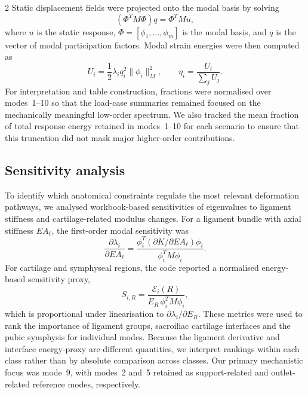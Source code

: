 \documentclass[openacc]{rsproca_new}
\begin{document}
\begin{multicols}{2}
Static displacement fields were projected onto the modal basis by solving
\begin{equation}
(\Phi^{T}M\Phi)q = \Phi^{T}Mu,
\end{equation}
where $u$ is the static response, $\Phi=[\phi_{1},\ldots,\phi_{m}]$ is the modal basis, and $q$ is the vector of modal participation factors. Modal strain energies were then computed as
\begin{equation}
U_{i}=\frac{1}{2}\lambda_{i}q_{i}^{2}\lVert\phi_{i}\rVert_{M}^{2}, \qquad
\eta_{i}=\frac{U_{i}}{\sum_{j}U_{j}}.
\end{equation}
For interpretation and table construction, fractions were normalised over modes~1--10 so that the load-case summaries remained focused on the mechanically meaningful low-order spectrum. We also tracked the mean fraction of total response energy retained in modes~1--10 for each scenario to ensure that this truncation did not mask major higher-order contributions.

\subsection{Sensitivity analysis}

To identify which anatomical constraints regulate the most relevant deformation pathways, we analysed workbook-based sensitivities of eigenvalues to ligament stiffness and cartilage-related modulus changes. For a ligament bundle with axial stiffness $EA_{\ell}$, the first-order modal sensitivity was
\begin{equation}
\frac{\partial \lambda_{i}}{\partial EA_{\ell}}
=
\frac{\phi_{i}^{T}(\partial K/\partial EA_{\ell})\phi_{i}}
{\phi_{i}^{T}M\phi_{i}}.
\end{equation}
For cartilage and symphyseal regions, the code reported a normalised energy-based sensitivity proxy,
\begin{equation}
S_{i,R}=\frac{\mathcal{E}_{i}(R)}{E_{R}\,\phi_{i}^{T}M\phi_{i}},
\end{equation}
which is proportional under linearisation to $\partial \lambda_{i}/\partial E_{R}$. These metrics were used to rank the importance of ligament groups, sacroiliac cartilage interfaces and the pubic symphysis for individual modes. Because the ligament derivative and interface energy-proxy are different quantities, we interpret rankings within each class rather than by absolute comparison across classes. Our primary mechanistic focus was mode~9, with modes~2 and~5 retained as support-related and outlet-related reference modes, respectively.


\end{multicols}
\end{document}
